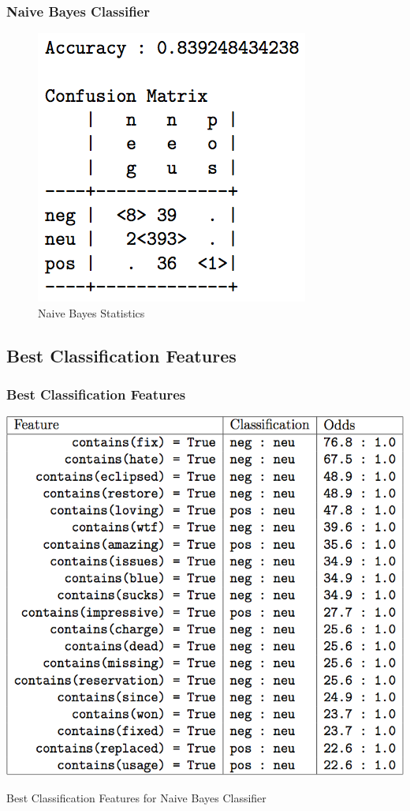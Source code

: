 \documentclass{beamer}
\begin{document}
\begin{frame}[fragile] %
\frametitle{Naive Bayes Classifier}

\begin{figure}[h]
\centering
\includegraphics[scale=0.5]{img/fig_nb_stats.png}
\caption{Naive Bayes Statistics}
\label{fig:naive_accuracy}
\end{figure}

\end{frame}

\subsection{Best Classification Features}

\begin{frame}
\frametitle{Best Classification Features}
\begin{table}[h]
\centering
\includegraphics[scale=0.25]{img/table_bestfeatures.png}
\caption{Best Classification Features for Naive Bayes Classifier}
\label{table:naive_features}
\end{table}
\end{frame}
\end{document}
